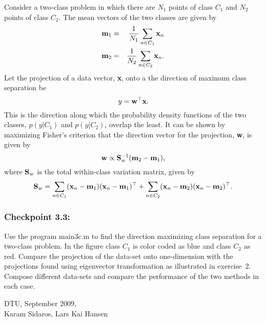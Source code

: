 \documentclass[times,12pt]{article}    %
\def\x{{\bf x}}
\def\w{{\bf w}}
\def\S{{\bf S}}
\def\m{{\bf m}}
\begin{document}
Consider a two-class problem in which there are $N_1$ points of class
$C_1$ and $N_2$ points of class $C_2$. The mean vectors of the two
classes are given by
\begin{eqnarray}
  \label{eq:m1}
  \m_1 &=& \frac{1}{N_1} \sum_{n\in C_1} \x_n\\
  \m_2 &=& \frac{1}{N_2} \sum_{n\in C_2} \x_n.
\end{eqnarray}
Let the projection of a data vector, \x, onto a the direction of
maximum class separation be
\begin{equation}
  \label{eq:fisher1}
  y=\w^\top\x.
\end{equation}
This is the direction along which the probability density
functions of the two classes, $p(y|C_1)$ and $p(y|C_2)$, overlap
the least. It can be shown by maximizing Fisher's criterion  that
the direction vector for the projection, \w, is given by
\begin{equation}
  \label{eq:wsol}
  \w \propto \S_w^{-1}(\m_2 -\m_1),
\end{equation}
where $\S_w$ is the total within-class variation matrix, given by
\begin{equation}
  \label{eq:Sw}
  \S_w = \sum_{n\in C_1} (\x_n-\m_1)(\x_n -\m_1)^\top +
         \sum_{n\in C_2} (\x_n-\m_2)(\x_n -\m_2)^\top.
\end{equation}

\subsubsection*{Checkpoint 3.3:}
Use the program {\sf main3c.m} to find the direction maximizing class
separation for a two-class problem. In the figure class $C_1$ is color coded as blue and class $C_2$ as red. Compare the projection of the
data-set onto one-dimension with the projections found using
eigenvector transformation as illustrated in exercise~2. Compose
different data-sets and compare the performance of the two methods in
each case.




\vspace*{2cm}
\noindent DTU, September 2009,\\[2mm]
Karam Sidaros, Lars Kai Hansen
\end{document}
